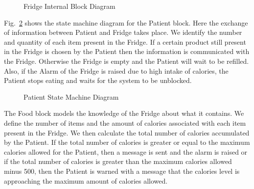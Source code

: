 \documentclass[a4paper,twoside]{article}
\begin{document}
\begin{figure}[!h]
  \centering
  {}
  \caption{Fridge Internal Block Diagram}
  \label{fig:fridgeibd}
 \end{figure}
 
Fig.~\ref{fig:patientstm} shows the state machine diagram for the Patient block. Here the exchange of information between Patient and Fridge takes place. We identify the number and quantity of each item present in the Fridge. If a certain product still present in the Fridge is chosen by the Patient then the information is  communicated with the Fridge.  Otherwise the Fridge is empty and the Patient will wait to be refilled. Also, if the Alarm of the Fridge is raised due to  high intake of calories, the Patient stops eating and waits for the system to be unblocked.
 
\begin{figure}[!h]
  \centering
  {}
  \caption{Patient State Machine Diagram}
  \label{fig:patientstm}
 \end{figure}
 
The Food block models the knowledge of the Fridge about what it contains. We define the number of items and the amount of calories associated with each item present in the Fridge. We then calculate the total number of calories accumulated by the Patient. If the total number of calories is greater or equal to the maximum calories allowed for the Patient, then a message is sent and the alarm is raised or if the total number of calories is greater than the maximum calories allowed minus 500, then the Patient is warned with a message that the calories level is approaching the maximum amount of calories allowed. 


\end{document}
